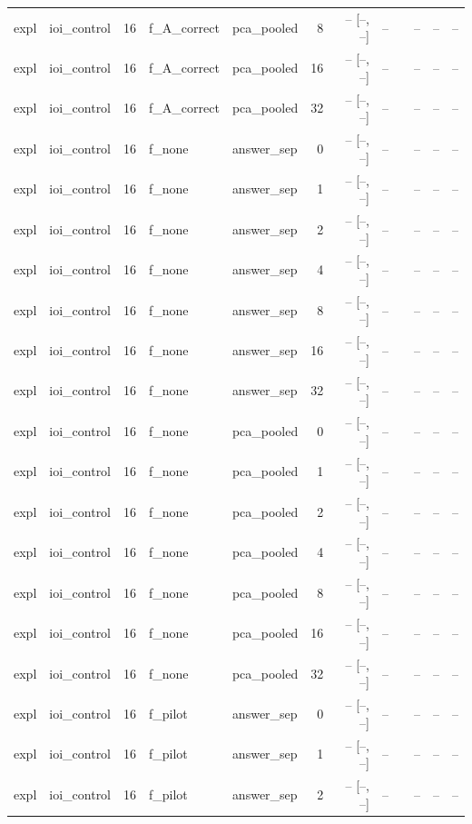 \begin{tabular}{llrllrrrlrrr}
expl & ioi\_control & 16 & f\_A\_correct & pca\_pooled & 8 & -- [--, --] & -- &  & -- & -- & -- \\
expl & ioi\_control & 16 & f\_A\_correct & pca\_pooled & 16 & -- [--, --] & -- &  & -- & -- & -- \\
expl & ioi\_control & 16 & f\_A\_correct & pca\_pooled & 32 & -- [--, --] & -- &  & -- & -- & -- \\
expl & ioi\_control & 16 & f\_none & answer\_sep & 0 & -- [--, --] & -- &  & -- & -- & -- \\
expl & ioi\_control & 16 & f\_none & answer\_sep & 1 & -- [--, --] & -- &  & -- & -- & -- \\
expl & ioi\_control & 16 & f\_none & answer\_sep & 2 & -- [--, --] & -- &  & -- & -- & -- \\
expl & ioi\_control & 16 & f\_none & answer\_sep & 4 & -- [--, --] & -- &  & -- & -- & -- \\
expl & ioi\_control & 16 & f\_none & answer\_sep & 8 & -- [--, --] & -- &  & -- & -- & -- \\
expl & ioi\_control & 16 & f\_none & answer\_sep & 16 & -- [--, --] & -- &  & -- & -- & -- \\
expl & ioi\_control & 16 & f\_none & answer\_sep & 32 & -- [--, --] & -- &  & -- & -- & -- \\
expl & ioi\_control & 16 & f\_none & pca\_pooled & 0 & -- [--, --] & -- &  & -- & -- & -- \\
expl & ioi\_control & 16 & f\_none & pca\_pooled & 1 & -- [--, --] & -- &  & -- & -- & -- \\
expl & ioi\_control & 16 & f\_none & pca\_pooled & 2 & -- [--, --] & -- &  & -- & -- & -- \\
expl & ioi\_control & 16 & f\_none & pca\_pooled & 4 & -- [--, --] & -- &  & -- & -- & -- \\
expl & ioi\_control & 16 & f\_none & pca\_pooled & 8 & -- [--, --] & -- &  & -- & -- & -- \\
expl & ioi\_control & 16 & f\_none & pca\_pooled & 16 & -- [--, --] & -- &  & -- & -- & -- \\
expl & ioi\_control & 16 & f\_none & pca\_pooled & 32 & -- [--, --] & -- &  & -- & -- & -- \\
expl & ioi\_control & 16 & f\_pilot & answer\_sep & 0 & -- [--, --] & -- &  & -- & -- & -- \\
expl & ioi\_control & 16 & f\_pilot & answer\_sep & 1 & -- [--, --] & -- &  & -- & -- & -- \\
expl & ioi\_control & 16 & f\_pilot & answer\_sep & 2 & -- [--, --] & -- &  & -- & -- & -- \\

\end{tabular}
